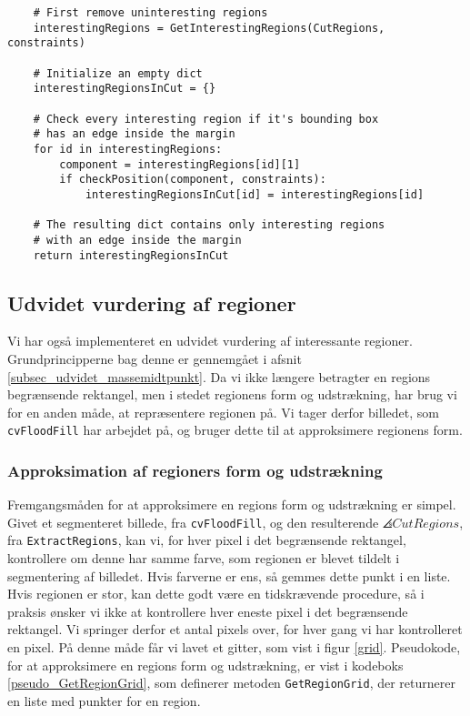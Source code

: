 {\begin{lstlisting}
    # First remove uninteresting regions
    interestingRegions = GetInterestingRegions(CutRegions, constraints)

    # Initialize an empty dict
    interestingRegionsInCut = {}

    # Check every interesting region if it's bounding box
    # has an edge inside the margin
    for id in interestingRegions:
        component = interestingRegions[id][1]
        if checkPosition(component, constraints):
            interestingRegionsInCut[id] = interestingRegions[id]

    # The resulting dict contains only interesting regions
    # with an edge inside the margin
    return interestingRegionsInCut
\end{lstlisting}

\subsection{Udvidet vurdering af regioner}
Vi har også implementeret en udvidet vurdering af interessante
regioner. Grundprincipperne bag denne er gennemgået i afsnit
\ref{subsec_udvidet_massemidtpunkt}. Da vi ikke længere betragter en
regions begrænsende rektangel, men i stedet regionens form og
udstrækning, har brug vi for en anden måde, at repræsentere regionen på.
Vi tager derfor billedet, som \texttt{cvFloodFill} har arbejdet på, og
bruger dette til at approksimere regionens form.

\subsubsection{Approksimation af regioners form og udstrækning}
Fremgangsmåden for at approksimere en regions form og udstrækning er
simpel. Givet et segmenteret billede, fra \texttt{cvFloodFill}, og den
resulterende $\angles{CutRegions}$, fra \texttt{ExtractRegions}, kan vi,
for hver pixel i det begrænsende rektangel, kontrollere om denne har
samme farve, som regionen er blevet tildelt i segmentering af billedet.
Hvis farverne er ens, så gemmes dette punkt i en liste. Hvis regionen er
stor, kan dette godt være en tidskrævende procedure, så i praksis ønsker
vi ikke at kontrollere hver eneste pixel i det begrænsende rektangel. Vi
springer derfor et antal pixels over, for hver gang vi har kontrolleret
en pixel.  På denne måde får vi lavet et gitter, som vist i figur
\ref{grid}.  Pseudokode, for at approksimere en regions form og
udstrækning, er vist i kodeboks \ref{pseudo_GetRegionGrid}, som
definerer metoden \texttt{GetRegionGrid}, der returnerer en liste med
punkter for en region.

}

